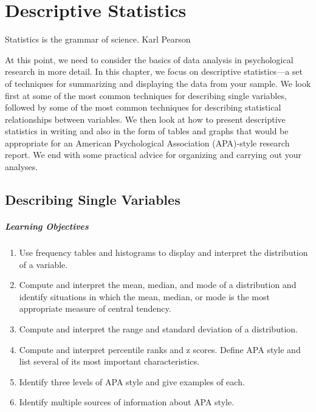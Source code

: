 \chapter{Descriptive Statistics}

Statistics is the grammar of science.
Karl Pearson


At this point, we need to consider the basics of data analysis in psychological research in more detail. In this chapter, we focus on descriptive statistics---a set of techniques for summarizing and displaying the data from your sample. We look first at some of the most common techniques for describing single variables, followed by some of the most common techniques for describing statistical relationships between variables. We then look at how to present descriptive statistics in writing and also in the form of tables and graphs that would be appropriate for an American Psychological Association (APA)-style research report. We end with some practical advice for organizing and carrying out your analyses.

\section{Describing Single Variables}


\paragraph{Learning Objectives}
    \begin{enumerate}
    \item   Use frequency tables and histograms to display and interpret the distribution of a variable.
\item Compute and interpret the mean, median, and mode of a distribution and identify situations in which the mean, median, or mode is the most appropriate measure of central tendency.

\item Compute and interpret the range and standard deviation of a distribution.

\item Compute and interpret percentile ranks and z scores.
Define APA style and list several of its most important characteristics.
\item Identify three levels of APA style and give examples of each.

\item  Identify multiple sources of information about APA style.

      \end{enumerate}


